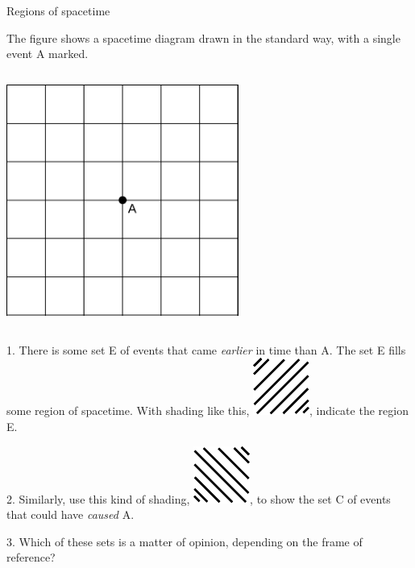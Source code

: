 \begin{frame}{Regions of spacetime}

\dq
The figure shows a spacetime diagram drawn in the standard way, with a single event A marked.

\vspace{3mm}

  \begin{mycolumns}

    \begin{column}{.3\textwidth}\includegraphics[width=3in]{ch03/figs/shade-spacetime}\end{column}

    \begin{column}{.7\textwidth}

    1. There is some set E of events that
    came \emph{earlier} in time than A. The set E fills some region of spacetime.
    With shading like this, \includegraphics{ch03/figs/shading-1}, indicate the region E.

   2. Similarly, use this kind of shading, \includegraphics{ch03/figs/shading-2}, to show the
   set C of events that could have \emph{caused} A.

    3. Which of these sets is a matter of opinion, depending on the frame of reference?

    \end{column}
  \end{mycolumns}


\end{frame}
